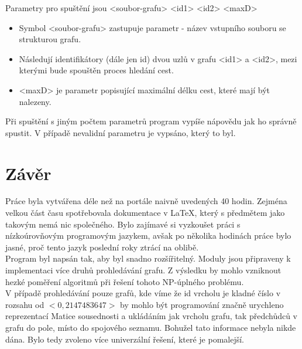 \documentclass[
12pt,
a4paper,
pdftex,
czech,
titlepage
]{report}
\begin{document}
Parametry pro spuštění jsou <soubor-grafu> <id1> <id2> <maxD>
\begin{itemize}
	\item Symbol <soubor-grafu> zastupuje parametr - název vstupního souboru se strukturou grafu.
	\item Následují identifikátory (dále jen id) dvou uzlů v grafu <id1> a <id2>, mezi kterými bude spouštěn proces hledání cest.
	\item <maxD> je parametr popisující maximální délku cest, které mají být nalezeny.
\end{itemize}

Při spuštění s jiným počtem parametrů program vypíše nápovědu jak ho správně spustit. V případě nevalidní parametru je vypsáno, který to byl. 

\chapter{Závěr}
Práce byla vytvářena déle než na portále naivně uvedených 40 hodin. Zejména velkou část času spotřebovala dokumentace v \LaTeX, který s předmětem jako takovým nemá nic společného. Bylo zajímavé si vyzkoušet práci s nízkoúrovňovým programovým jazykem, avšak po několika hodinách práce bylo jasné, proč tento jazyk poslední roky ztrácí na oblibě.\\
Program byl napsán tak, aby byl snadno rozšířitelný. Moduly jsou připraveny k implementaci více druhů prohledávání grafu. Z výsledku by mohlo vzniknout hezké poměření algoritmů při řešení tohoto NP-úplného problému.\\
V případě prohledávání pouze grafů, kde víme že id vrcholu je kladné číslo v rozsahu od $<0,2147483647>$ by mohlo být programování značně urychleno reprezentací Matice sousednosti a ukládáním jak vrcholu grafu, tak předchůdců v grafu do pole, místo do spojového seznamu. Bohužel tato informace nebyla nikde dána. Bylo tedy zvoleno více univerzální řešení, které je pomalejší. 
\end{document}
